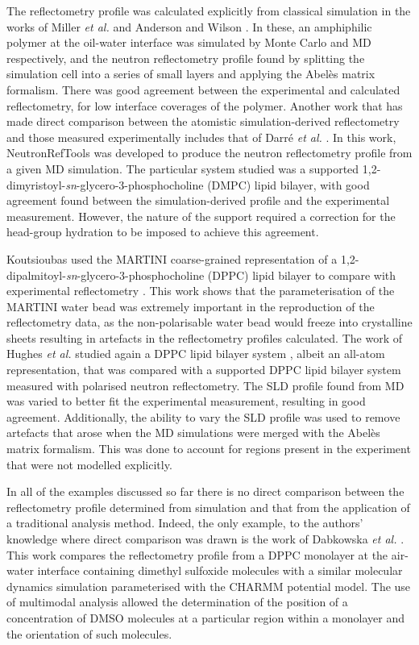 \documentclass[amsmath,amssymb,twocolumn,superscriptaddress]{revtex4-1}
\begin{document}
The reflectometry profile was calculated explicitly from classical
simulation in the works of Miller \emph{et al.} and Anderson and
Wilson \cite{miller_monte_2003,anderson_molecular_2004}.
In these, an amphiphilic polymer at the oil-water interface was simulated by
Monte Carlo and MD respectively, and the neutron reflectometry profile
found by splitting the simulation cell into a series of small layers and
applying the Abel\`{e}s matrix formalism.
There was good agreement between the experimental and calculated
reflectometry, for low interface coverages of the polymer.
Another work that has made direct comparison between the atomistic
simulation-derived reflectometry and those measured experimentally includes
that of Darr\'{e} \emph{et al.} \cite{darre_molecular_2015}.
In this work, NeutronRefTools was developed to produce the neutron
reflectometry profile from a given MD simulation.
The particular system studied was a supported
1,2-dimyristoyl-\emph{sn}-glycero-3-phosphocholine (DMPC) lipid bilayer,
with good agreement found between the simulation-derived profile and the
experimental measurement.
However, the nature of the support required a correction for the head-group
hydration to be imposed to achieve this agreement.

Koutsioubas used the MARTINI coarse-grained representation of a
1,2-dipalmitoyl-\emph{sn}-glycero-3-phosphocholine (DPPC) lipid bilayer to
compare with experimental reflectometry \cite{koutsioubas_combined_2016}.
This work shows that the parameterisation of the MARTINI water bead was
extremely important in the reproduction of the reflectometry data, as the
non-polarisable water bead would freeze into crystalline sheets resulting
in artefacts in the reflectometry profiles calculated.
The work of Hughes \emph{et al.} studied again a DPPC lipid bilayer
system \cite{hughes_interpretation_2016}, albeit an all-atom representation,
that was compared with a supported DPPC lipid bilayer system measured with
polarised neutron reflectometry.
The SLD profile found from MD was varied to better fit the experimental
measurement, resulting in good agreement.
Additionally, the ability to vary the SLD profile was used to remove
artefacts that arose when the MD simulations were merged with the Abel\`{e}s
matrix formalism.
This was done to account for regions present in the experiment that were not
modelled explicitly.

In all of the examples discussed so far there is no direct comparison
between the reflectometry profile determined from simulation and that from
the application of a traditional analysis method.
Indeed, the only example, to the authors' knowledge where direct comparison
was drawn is the work of
Dabkowska \emph{et al.} \cite{dabkowska_modulation_2014}.
This work compares the reflectometry profile from a DPPC monolayer at the
air-water interface containing dimethyl sulfoxide molecules with a similar
molecular dynamics simulation parameterised with the CHARMM potential model.
The use of multimodal analysis allowed the determination of the position of
a concentration of DMSO molecules at a particular region within a monolayer
and the orientation of such molecules.
\end{document}
